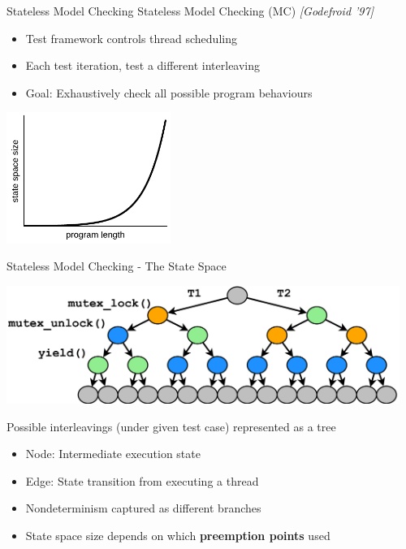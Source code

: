 \documentclass[xcolor=dvipsnames]{beamer}
\begin{document}
\begin{frame}{Stateless Model Checking}
	Stateless Model Checking (MC) {\em [Godefroid '97]}
	\begin{itemize}
		\item Test framework controls thread scheduling
		\item Each test iteration, test a different interleaving
		\item Goal: Exhaustively check all possible program behaviours
	\end{itemize}
	\pause
	\linegap

	\begin{center}
		\includegraphics[width=0.4\textwidth]{exponence.pdf}
	\end{center}
\end{frame}

\begin{frame}{Stateless Model Checking - The State Space}
	\begin{center}
		\includegraphics[width=0.96\textwidth]{../../oopsla/tree-maximal-only.pdf}
	\end{center}
	\linegap

	Possible interleavings (under given test case) represented as a tree
	\begin{itemize}
		\item Node: Intermediate execution state
		\item Edge: State transition from executing a thread
		\item Nondeterminism captured as different branches
		\item State space size depends on which {\bf preemption points} used
	\end{itemize}
\end{frame}
\end{document}
